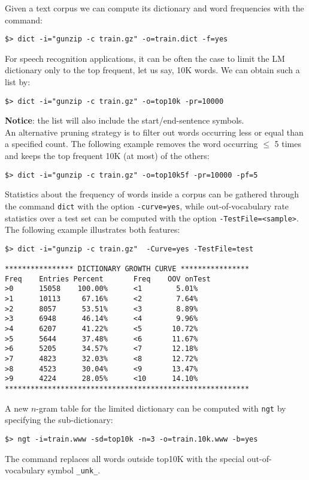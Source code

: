 Given a text corpus we can compute its dictionary and word frequencies
with the command:

\begin{verbatim}
$> dict -i="gunzip -c train.gz" -o=train.dict -f=yes
\end{verbatim}

\noindent
For speech recognition applications, it  can be often the case to limit the LM dictionary  only to the top frequent, let us say,
10K words. We can obtain such a list by:
\begin{verbatim}
$> dict -i="gunzip -c train.gz" -o=top10k -pr=10000
\end{verbatim}


\noindent
{\bf Notice}: the list will also include the start/end-sentence symbols.\\

\noindent
An alternative pruning strategy is to filter out words occurring less or equal than a specified 
count. The following example removes the word occurring $\le$ 5 times and keeps
the top frequent 10K (at most) of the others:
\begin{verbatim}
$> dict -i="gunzip -c train.gz" -o=top10k5f -pr=10000 -pf=5
\end{verbatim}


\noindent
Statistics about the frequency of words inside a corpus can be gathered through  the command {\tt dict}
with the option {\tt -curve=yes}, while out-of-vocabulary rate statistics over a test set can be computed with
the option {\tt -TestFile=<sample>}.  The following example illustrates both features:
\begin{verbatim}
$> dict -i="gunzip -c train.gz"  -Curve=yes -TestFile=test

**************** DICTIONARY GROWTH CURVE ****************
Freq    Entries Percent       Freq    OOV onTest
>0      15058    100.00%      <1        5.01%
>1      10113     67.16%      <2        7.64%
>2      8057      53.51%      <3        8.89%
>3      6948      46.14%      <4        9.96%
>4      6207      41.22%      <5       10.72%
>5      5644      37.48%      <6       11.67%
>6      5205      34.57%      <7       12.18%
>7      4823      32.03%      <8       12.72%
>8      4523      30.04%      <9       13.47%
>9      4224      28.05%      <10      14.10%
*********************************************************

\end{verbatim}

\noindent
A new  $n$-gram table for the  limited dictionary can  be computed with {\tt ngt} by specifying 
the sub-dictionary:
\begin{verbatim}
$> ngt -i=train.www -sd=top10k -n=3 -o=train.10k.www -b=yes
\end{verbatim}
The command replaces  all words outside  top10K with  the special
out-of-vocabulary symbol {\tt \_unk\_}.

